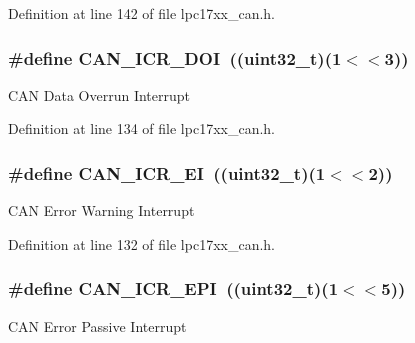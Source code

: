 \-Definition at line 142 of file lpc17xx\-\_\-can.\-h.

\hypertarget{group___c_a_n___private___macros_ga9fae105cbd02053ab9bd369c473b859c}{
\subsubsection[{\-C\-A\-N\-\_\-\-I\-C\-R\-\_\-\-D\-O\-I}]{\setlength{\rightskip}{0pt plus 5cm}\#define {\bf \-C\-A\-N\-\_\-\-I\-C\-R\-\_\-\-D\-O\-I}~((uint32\-\_\-t)(1$<$$<$3))}}\label{group___c_a_n___private___macros_ga9fae105cbd02053ab9bd369c473b859c}
\-C\-A\-N \-Data \-Overrun \-Interrupt 

\-Definition at line 134 of file lpc17xx\-\_\-can.\-h.

\hypertarget{group___c_a_n___private___macros_gab04d96ef59661fd0d47ff05ddc3397d9}{
\subsubsection[{\-C\-A\-N\-\_\-\-I\-C\-R\-\_\-\-E\-I}]{\setlength{\rightskip}{0pt plus 5cm}\#define {\bf \-C\-A\-N\-\_\-\-I\-C\-R\-\_\-\-E\-I}~((uint32\-\_\-t)(1$<$$<$2))}}\label{group___c_a_n___private___macros_gab04d96ef59661fd0d47ff05ddc3397d9}
\-C\-A\-N \-Error \-Warning \-Interrupt 

\-Definition at line 132 of file lpc17xx\-\_\-can.\-h.

\hypertarget{group___c_a_n___private___macros_ga81258499c237327be7203edaa80adcd0}{
\subsubsection[{\-C\-A\-N\-\_\-\-I\-C\-R\-\_\-\-E\-P\-I}]{\setlength{\rightskip}{0pt plus 5cm}\#define {\bf \-C\-A\-N\-\_\-\-I\-C\-R\-\_\-\-E\-P\-I}~((uint32\-\_\-t)(1$<$$<$5))}}\label{group___c_a_n___private___macros_ga81258499c237327be7203edaa80adcd0}
\-C\-A\-N \-Error \-Passive \-Interrupt 

